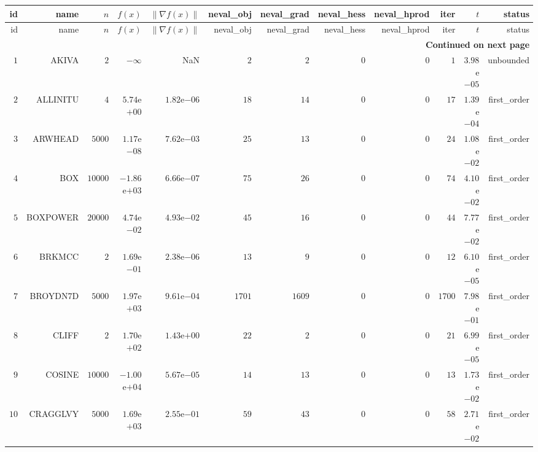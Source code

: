 \begin{longtable}{rrrrrrrrrrrr}
  \hline
  id & name & \(n\) & \(f(x)\) & \(\|\nabla f(x)\|\) & neval\_obj & neval\_grad & neval\_hess & neval\_hprod & iter & \(t\) & status \\\hline
  \endfirsthead
  \hline
  id & name & \(n\) & \(f(x)\) & \(\|\nabla f(x)\|\) & neval\_obj & neval\_grad & neval\_hess & neval\_hprod & iter & \(t\) & status \\\hline
  \endhead
  \hline
  \multicolumn{12}{r}{{\bfseries Continued on next page}}\\
  \hline
  \endfoot
  \endlastfoot
  \(     1\) & AKIVA & \(     2\) & \(-\infty\) &       NaN & \(     2\) & \(     2\) & \(     0\) & \(     0\) & \(     1\) & \( 3.98\)e\(-05\) & unbounded \\
  \(     2\) & ALLINITU & \(     4\) & \( 5.74\)e\(+00\) & \( 1.82\)e\(-06\) & \(    18\) & \(    14\) & \(     0\) & \(     0\) & \(    17\) & \( 1.39\)e\(-04\) & first\_order \\
  \(     3\) & ARWHEAD & \(  5000\) & \( 1.17\)e\(-08\) & \( 7.62\)e\(-03\) & \(    25\) & \(    13\) & \(     0\) & \(     0\) & \(    24\) & \( 1.08\)e\(-02\) & first\_order \\
  \(     4\) & BOX & \( 10000\) & \(-1.86\)e\(+03\) & \( 6.66\)e\(-07\) & \(    75\) & \(    26\) & \(     0\) & \(     0\) & \(    74\) & \( 4.10\)e\(-02\) & first\_order \\
  \(     5\) & BOXPOWER & \( 20000\) & \( 4.74\)e\(-02\) & \( 4.93\)e\(-02\) & \(    45\) & \(    16\) & \(     0\) & \(     0\) & \(    44\) & \( 7.77\)e\(-02\) & first\_order \\
  \(     6\) & BRKMCC & \(     2\) & \( 1.69\)e\(-01\) & \( 2.38\)e\(-06\) & \(    13\) & \(     9\) & \(     0\) & \(     0\) & \(    12\) & \( 6.10\)e\(-05\) & first\_order \\
  \(     7\) & BROYDN7D & \(  5000\) & \( 1.97\)e\(+03\) & \( 9.61\)e\(-04\) & \(  1701\) & \(  1609\) & \(     0\) & \(     0\) & \(  1700\) & \( 7.98\)e\(-01\) & first\_order \\
  \(     8\) & CLIFF & \(     2\) & \( 1.70\)e\(+02\) & \( 1.43\)e\(+00\) & \(    22\) & \(     2\) & \(     0\) & \(     0\) & \(    21\) & \( 6.99\)e\(-05\) & first\_order \\
  \(     9\) & COSINE & \( 10000\) & \(-1.00\)e\(+04\) & \( 5.67\)e\(-05\) & \(    14\) & \(    13\) & \(     0\) & \(     0\) & \(    13\) & \( 1.73\)e\(-02\) & first\_order \\
  \(    10\) & CRAGGLVY & \(  5000\) & \( 1.69\)e\(+03\) & \( 2.55\)e\(-01\) & \(    59\) & \(    43\) & \(     0\) & \(     0\) & \(    58\) & \( 2.71\)e\(-02\) & first\_order \\

\end{longtable}
